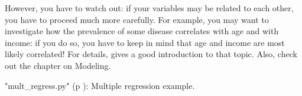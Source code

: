 However, you have to watch out: if your variables may be related to each other, you have to proceed much more carefully. For example, you may want to investigate how the prevalence of some disease correlates with age and with income: if you do so, you have to keep in mind that age and income are most likely correlated! For details, \cite{Kaplan2009} gives a good introduction to that topic. Also, check out the chapter on Modeling.

\PyImg "mult\_regress.py" (p \pageref{py:mult_regress}): Multiple regression example.
